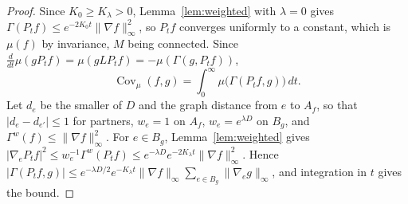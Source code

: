 \documentclass[aps,prd,twocolumn,superscriptaddress,nofootinbib,longbibliography,floatfix,amsmath,amssymb,10pt]{revtex4-2}
\theoremstyle{definition}
\theoremstyle{remark}
\newcommand{\Cov}{\operatorname{Cov}}
\begin{document}
\begin{proof}
Since $K_0\ge K_\lambda>0$, Lemma~\ref{lem:weighted} with $\lambda=0$ gives
$\Gamma(P_tf)\le e^{-2K_0t}\|\nabla f\|_\infty^2$, so $P_tf$ converges uniformly
to a constant, which is $\mu(f)$ by invariance, $M$ being connected. Since
$\frac d{dt}\mu(gP_tf)=\mu(gLP_tf)=-\mu(\Gamma(g,P_tf))$,
\[
\Cov_\mu(f,g)=\int_0^\infty\mu\bigl(\Gamma(P_tf,g)\bigr)\,dt .
\]
Let $d_e$ be the smaller of $D$ and the graph distance from $e$ to $A_f$, so
that $|d_e-d_{e'}|\le1$ for partners, $w_e=1$ on $A_f$, $w_e=e^{\lambda D}$ on
$B_g$, and
$\Gamma^w(f)\le\|\nabla f\|_\infty^2$. For $e\in B_g$, Lemma~\ref{lem:weighted}
gives $|\nabla_eP_tf|^2\le w_e^{-1}\Gamma^w(P_tf)\le e^{-\lambda D}e^{-2K_\lambda t}
\|\nabla f\|_\infty^2$. Hence $|\Gamma(P_tf,g)|\le e^{-\lambda D/2}e^{-K_\lambda t}
\|\nabla f\|_\infty\sum_{e\in B_g}\|\nabla_eg\|_\infty$, and integration in $t$
gives the bound.
\end{proof}
\end{document}
